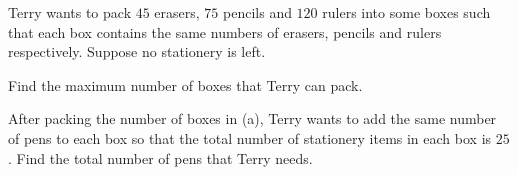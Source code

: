  Terry wants to pack $45$ erasers, $75$ pencils and $120$ rulers into some boxes such that each box contains the same numbers of erasers, pencils and rulers respectively. Suppose no stationery is left.

\begin{subparts}
  \item Find the maximum number of boxes that Terry can pack.
  \item After packing the number of boxes in (a), Terry wants to add the same number of pens to each box so that the total number of stationery items in each box is $25$. Find the total number of pens that Terry needs.
\end{subparts}

